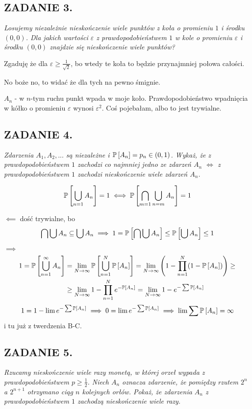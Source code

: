 \documentclass{article}
\begin{document}
\subsection*{ZADANIE 3.}
\emph{\color{yellow}Losujemy niezależnie nieskończenie wiele punktów z koła o promieniu $1$ i środku $(0, 0)$. Dla jakich wartości $\varepsilon$ z prawdopodobieństwem $1$ w kole o promieniu $\varepsilon$ i środku $(0, 0)$ znajdzie się nieskończenie wiele punktów?}
\smallskip

Zgaduję że dla $\varepsilon\geq\frac1{\sqrt2}$, bo wtedy te koła to będzie przynajmniej połowa całości.

No boże no, to widać że dla tych na pewno śmignie.

$A_n$ - w $n$-tym ruchu punkt wpada w moje koło. Prawdopodobieństwo wpadnięcia w kółko o promieniu $\varepsilon$ wynosi $\varepsilon^2$.
Coś pojebałam, albo to jest trywialne.


\subsection*{ZADANIE 4.}
\emph{\color{yellow}Zdarzenia $A_1,A_2,...$ są niezależne i $\mathbb{P}\left[A_n\right]=p_n\in(0,1)$. Wykaż, że z prawdopodobieństwem $1$ zachodzi co najmniej jedno ze zdarzeń $A_n$ $\iff$ z prawdopodobieństwem $1$ zachodzi nieskończenie wiele zdarzeń $A_n$.}
\smallskip

$$\mathbb{P}\left[\bigcup\limits_{n=1}A_n\right]=1\iff\mathbb{P}\left[\bigcap\limits_{m=1}\bigcup\limits_{n=m}A_n\right]=1$$

$\impliedby$
dość trywialne, bo
$$\bigcap\bigcup A_n\subseteq\bigcup A_n\implies 1=\mathbb{P}\left[\bigcap\bigcup A_n\right]\leq \mathbb{P}\left[\bigcup A_n\right]\leq1$$

$\implies$
\begin{align*}
    1=\mathbb{P}\left[\bigcup\limits_{n=1}^\infty A_n\right]&=\lim\limits_{N\to\infty}\mathbb{P}\left[\bigcup\limits_{n=1}^N\mathbb{P}\left[A_n\right]\right]=\lim\limits_{N\to \infty}\left(1-\prod\limits_{n=1}^N(1-\mathbb{P}\left[A_n\right])\right)\geq\\
    &\geq\lim\limits_{N\to\infty}1-\prod\limits_{n=1}^Ne^{-\mathbb{P}\left[A_n\right]}=\lim\limits_{N\to\infty}1-e^{-\sum\mathbb{P}\left[A_n\right]}
\end{align*}
$$1=1-\lim e^{-\sum\mathbb{P}\left[A_n\right]}\implies 0=\lim e^{-\sum\mathbb{P}\left[A_n\right]}\implies \lim\sum\mathbb{P}\left[A_n\right]=\infty$$
i tu już z twerdzenia B-C.


\subsection*{ZADANIE 5.}
\emph{\color{yellow}Rzucamy nieskończenie wiele razy monetą, w której orzeł wypada z prawdopodobieństwem $p\geq\frac12$. Niech $A_n$ oznacza zdarzenie, że pomiędzy rzutem $2^n$ a $2^{n+1}$ otrzymano ciąg $n$ kolejnych orłów. Pokaż, że zdarzenia $A_n$ z prawdopodobieństwem $1$ zachodzą nieskończenie wiele razy.}
\smallskip
\end{document}
